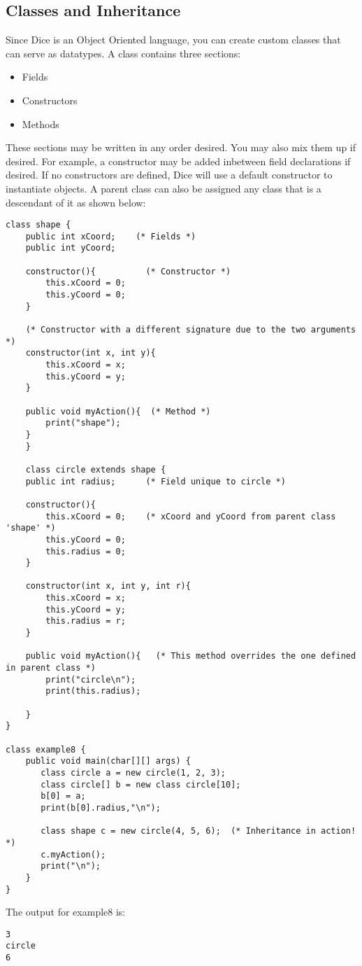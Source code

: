 \begin{homeworkProblem}
	\section{Classes and Inheritance}
	Since Dice is an Object Oriented language, you can create custom classes that can serve as datatypes. A class contains three sections:
	\begin{itemize}
		\item Fields
		\item Constructors
		\item Methods
	\end{itemize}
	These sections may be written in any order desired. You may also mix them up if desired. For example, a constructor may be added inbetween field declarations if desired. If no constructors are defined, Dice will use a default constructor to instantiate objects. A parent class can also be assigned any class that is a descendant of it as shown below:

	\begin{verbatim}
class shape {
	public int xCoord;    (* Fields *)
	public int yCoord;
	
	constructor(){  		(* Constructor *)
	  	this.xCoord = 0;
	  	this.yCoord = 0;
	}
	
	(* Constructor with a different signature due to the two arguments *)
	constructor(int x, int y){   
	  	this.xCoord = x;
	  	this.yCoord = y;
	}
	
	public void myAction(){  (* Method *)
	  	print("shape");
	}
	}
	
	class circle extends shape {
	public int radius;  	(* Field unique to circle *)
	
	constructor(){
	  	this.xCoord = 0;	(* xCoord and yCoord from parent class 'shape' *)
	  	this.yCoord = 0;
	  	this.radius = 0;
	}
	
	constructor(int x, int y, int r){
	  	this.xCoord = x;
	  	this.yCoord = y;
	  	this.radius = r;
	}
	
	public void myAction(){   (* This method overrides the one defined in parent class *)
	  	print("circle\n");
	  	print(this.radius);
	
	}
}

class example8 {
	public void main(char[][] args) {
	   class circle a = new circle(1, 2, 3); 
	   class circle[] b = new class circle[10];
	   b[0] = a;
	   print(b[0].radius,"\n");
	
	   class shape c = new circle(4, 5, 6);  (* Inheritance in action! *)
	   c.myAction();
	   print("\n");
	}
}
	\end{verbatim}

	The output for example8 is:
	\begin{verbatim}
3
circle
6
	\end{verbatim}
\end{homeworkProblem}